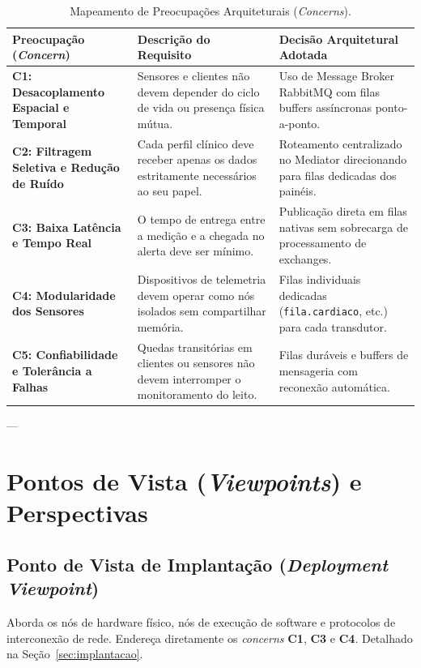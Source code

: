 \documentclass[12pt,a4paper]{article}
\begin{document}
\begin{table}[h!]
\centering
\small
\begin{tabular}{p{3.5cm}p{6cm}p{6cm}}
\toprule
\textbf{Preocupação (\textit{Concern})} & \textbf{Descrição do Requisito} & \textbf{Decisão Arquitetural Adotada} \\
\midrule
\textbf{C1: Desacoplamento Espacial e Temporal} & Sensores e clientes não devem depender do ciclo de vida ou presença física mútua. & Uso de Message Broker RabbitMQ com filas buffers assíncronas ponto-a-ponto. \\
\textbf{C2: Filtragem Seletiva e Redução de Ruído} & Cada perfil clínico deve receber apenas os dados estritamente necessários ao seu papel. & Roteamento centralizado no Mediator direcionando para filas dedicadas dos painéis. \\
\textbf{C3: Baixa Latência e Tempo Real} & O tempo de entrega entre a medição e a chegada no alerta deve ser mínimo. & Publicação direta em filas nativas sem sobrecarga de processamento de exchanges. \\
\textbf{C4: Modularidade dos Sensores} & Dispositivos de telemetria devem operar como nós isolados sem compartilhar memória. & Filas individuais dedicadas (\texttt{fila.cardiaco}, etc.) para cada transdutor. \\
\textbf{C5: Confiabilidade e Tolerância a Falhas} & Quedas transitórias em clientes ou sensores não devem interromper o monitoramento do leito. & Filas duráveis e buffers de mensageria com reconexão automática. \\
\bottomrule
\end{tabular}
\caption{Mapeamento de Preocupações Arquiteturais (\textit{Concerns}).}
\label{tab:concerns}
\end{table}

---

\section{Pontos de Vista (\textit{Viewpoints}) e Perspectivas}

\subsection{Ponto de Vista de Implantação (\textit{Deployment Viewpoint})}
Aborda os nós de hardware físico, nós de execução de software e protocolos de interconexão de rede. Endereça diretamente os \textit{concerns} \textbf{C1}, \textbf{C3} e \textbf{C4}. Detalhado na Seção~\ref{sec:implantacao}.
\end{document}
